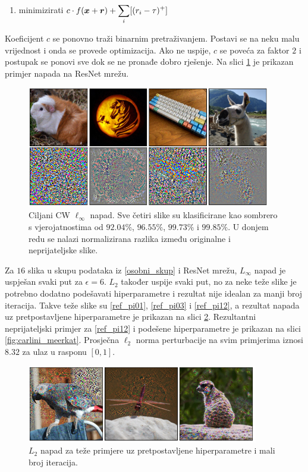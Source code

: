 \documentclass[utf8, diplomski]{fer}
\begin{document}
\begin{enumerate}[noitemsep, label=\textbullet]
  \item minimizirati $c \cdot f(\boldsymbol{x} + \boldsymbol{r}) + \smashoperator[r]{\sum_{i}} [(r_{i} - \tau )^{+}]$
\end{enumerate}

Koeficijent $c$ se ponovno traži binarnim pretraživanjem. Postavi se na neku malu vrijednost i onda se provede optimizacija. Ako ne uspije, $c$ se poveća za faktor $2$ i postupak se ponovi sve dok se ne pronađe dobro rješenje. Na slici \ref{fig:carlini_linf} je prikazan primjer napada na ResNet mrežu.

\begin{figure}[H]
\centering
\includegraphics[width=0.95\textwidth,keepaspectratio]{img/results/carlini_linf.png}
\caption{Ciljani CW $\ell_{\infty}$ napad. Sve četiri slike su klasificirane kao sombrero s vjerojatnostima od $92.04\%$, $96.55\%$, $99.73\%$ i $99.85\%$. U donjem redu se nalazi normalizirana razlika između originalne i neprijateljske slike.}
\label{fig:carlini_linf}
\end{figure}

Za $16$ slika u skupu podataka iz \ref{osobni_skup} i ResNet mrežu, $L_{\infty}$ napad je uspješan svaki put za $\epsilon = 6$. $L_{2}$ također uspije svaki put, no za neke teže slike je potrebno dodatno podešavati hiperparametre i rezultat nije idealan za manji broj iteracija. Takve teže slike su \ref{ref_pi01}, \ref{ref_pi03} i \ref{ref_pi12}, a rezultat napada uz pretpostavljene hiperparametre je prikazan na slici \ref{fig:carlini_fail}. Rezultantni neprijateljski primjer za \ref{ref_pi12} i podešene hiperparametre je prikazan na slici \ref{fig:carlini_meerkat}. Prosječna $\ell_{2}$ norma perturbacije na svim primjerima iznosi $8.32$ za ulaz u rasponu $[0, 1]$.

\begin{figure}[H]
\centering
\includegraphics[width=0.9\textwidth,keepaspectratio]{img/results/carlini_fail.png}
\caption{$L_{2}$ napad za teže primjere uz pretpostavljene hiperparametre i mali broj iteracija.}
\label{fig:carlini_fail}
\end{figure}
\end{document}
